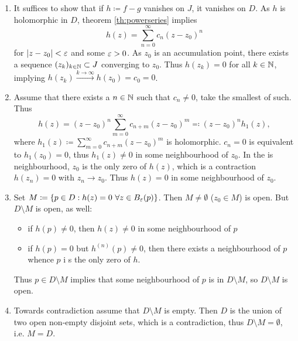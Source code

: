 \documentclass[a4paper,english]{article}
\begin{document}
\begin{pr}
    \begin{enumerate}
        \item 
        It suffices to show that if $h \coloneqq f - g$ vanishes on $J$, it vanishes on $D$.
        As $h$ is holomorphic in $D$,  theorem \ref{th:powerseries} implies
        \begin{equation*}
            h(z)
            = \sum_{n = 0}^{\infty} c_n (z - z_0)^n
        \end{equation*}
        for $| z - z_0 | < \varepsilon$ and some $\varepsilon > 0$.
        As $z_0$ is an accumulation point, there exists a sequence $(z_k)_{k \in \operatorname{\mathbb{N}}} \subset J$ converging to $z_0$.
        Thus $h(z_k) = 0$ for all $k \in \operatorname{\mathbb{N}}$, implying $h(z_k) \xrightarrow{k \to \infty} h(z_0) = c_0 = 0$.
        
        \item
        Assume that there exists a $n \in \operatorname{\mathbb{N}}$ such that $c_n \ne 0$, take the smallest of such.
        Thus
        \begin{equation*}
            h(z)
            = (z - z_0)^n \sum_{m = 0}^{\infty} c_{n + m} (z - z_0)^m
            \eqqcolon (z - z_0)^n h_1(z),
        \end{equation*}
        where $h_1(z) \coloneqq \sum_{m = 0}^{\infty} c_{n + m} (z - z_0)^m$ is holomorphic.
        $c_n = 0$ is equivalent to $h_1(z_0) = 0$, thus $h_1(z) \ne 0$ in some neighbourhood of $z_0$.
        In the is neighbourhood, $z_0$ is the only zero of $h(z)$, which is a contraction $h(z_n) = 0$ with $z_n \to z_0$.
        Thus $h(z) = 0$ in some neighbourhood of $z_0$.
        
        \item
        Set $M \coloneqq \{ p \in D: h(z) = 0 \ \forall z \in B_{\eps}(p)\}$.
        Then $M \ne \emptyset$ ($z_0 \in M$) is open.
        But $D \setminus M$ is open, as well:
        \begin{itemize}
            \item 
            if $h(p) \ne 0$, then $h(z) \ne 0$ in some neighbourhood of $p$
            
            \item
            if $h(p) = 0$ but $h^{(n)}(p) \ne 0$, then there exists a neighbourhood of $p$ whence $p$ i s the only zero of $h$.
        \end{itemize}
        Thus $p \in D \setminus M$ implies that some neighbourhood of $p$ is in $D \setminus M$, so $D \setminus M$ is open.
        
        \item
        Towards contradiction assume that $D \setminus M$ is empty.
        Then $D$ is the union of two open non-empty disjoint sets, which is a contradiction, thus $D \setminus M = \emptyset$, i.e. $M = D$.
    \end{enumerate}
\end{pr}
\end{document}
